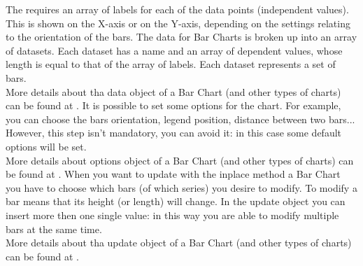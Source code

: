 			The  requires an array of labels for each of the data points (independent values). This is shown on the X-axis or on the Y-axis, depending on the settings relating to the orientation of the bars. The data for Bar Charts is broken up into an array of datasets. Each dataset has a name and an array of dependent values, whose length is equal to that of the array of labels. Each dataset represents a set of bars.\\
			More details about tha data object of a Bar Chart (and other types of charts) can be found at .
			It is possible to set some options for the chart. For example, you can choose the bars orientation, legend position, distance between two bars... However, this step isn't mandatory, you can avoid it: in this case some default options will be set.\\
			More details about options object of a Bar Chart (and other types of charts) can be found at .
			When you want to update with the inplace method a Bar Chart you have to choose which bars (of which series) you desire to modify. To modify a bar means that its height (or length) will change. In the update object you can insert more then one single value: in this way you are able to modify multiple bars at the same time.\\
			More details about tha update object of a Bar Chart (and other types of charts) can be found at .